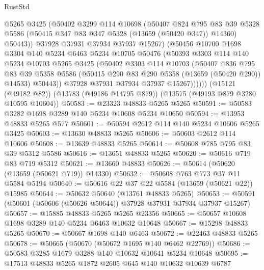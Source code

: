 \begin{lexlean}{RustStd}
\begin{coremodule}
              @5265
              @3425
              (@50402
                @3299
                @114
                @10698
                (@50407
                  @824
                  @795
                  @83
                  @39
                  @5328
                  @5586
                  (@50415 @347 @83 @347 @5328 (@13659 (@50420 @347)) @14360)
                  @50443))
              @37928
              @37931
              @37934
              @37937
              @15267)
            (@50456
              @10700
              @1698
              @3304
              @140
              @5234
              @6463
              @5234
              @10705
              @50476
              (@50393
                @3303
                @114
                @140
                @5234
                @10703
                @5265
                @3425
                (@50402
                  @3303
                  @114
                  @10703
                  (@50407
                    @836
                    @795
                    @83
                    @39
                    @5358
                    @5586
                    (@50415 @290 @83 @290 @5358 (@13659 (@50420 @290)) @14533)
                    @50443))
                @37928
                @37931
                @37934
                @37937
                @15267))))))
    (@15121 (@49182 @82))
    (@13783 (@49186 @14795 @879))
    (@13575 (@49193 @879 @3280 @10595 @10604))
@50583 := @23323 @48833 @5265 @5265
@50591 := @50583 @3282 @1698 @3289 @140 @5234 @10608 @5234 @10650
@50594 := @13953 @48833 @5265 @577
@50601 := @50594 @2612 @114 @140 @5234 @10606 @5265 @3425
@50603 := @13630 @48833 @5265
@50606 := @50603 @2612 @114 @10606
@50608 := @13639 @48833 @5265
@50614 := @50608 @785 @795 @83 @39 @5312 @5586
@50616 := @13651 @48833 @5265
@50620 := @50616 @719 @83 @719 @5312
@50621 := @13660 @48833
@50626 := @50614 (@50620 (@13659 (@50621 @719)) @14330)
@50632 := @50608 @763 @773 @37 @11 @5584 @5194
@50640 := @50616 @22 @37 @22 @5584 (@13659 (@50621 @22)) @15985
@50644 := @50632 @50640 (@13761 @48833 @5265)
@50653 := @50591 (@50601 (@50606 (@50626 @50644)) @37928 @37931 @37934 @37937 @15267)
@50657 := @15885 @48833 @5265 @5265 @23356
@50665 := @50657 @10608 @1698 @3289 @140 @5234 @6463 @10632 @10648
@50667 := @15298 @48833 @5265
@50670 := @50667 @1698 @140 @6463
@50672 := @22463 @48833 @5265
@50678 := @50665 (@50670 (@50672 @1695 @140 @6462 @22769))
@50686 := @50583 @3285 @1679 @3288 @140 @10632 @10641 @5234 @10648
@50695 := @17513 @48833 @5265 @1872 @2605 @645 @140 @10632 @10639 @6787

\end{coremodule}
\end{lexlean}
